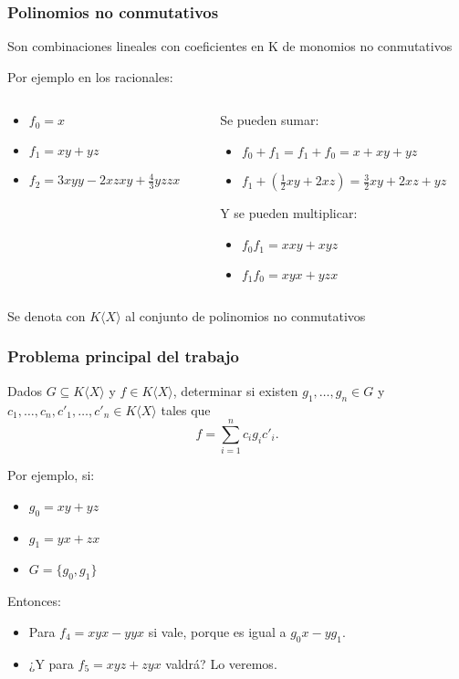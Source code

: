 \documentclass[spanish, aspectratio=169, hidecontrols]{beamer}
\begin{document}
\begin{frame}
  \frametitle{Polinomios no conmutativos}
  Son combinaciones lineales con coeficientes en K de monomios no conmutativos
  \pause
  \begin{exampleblock}{Por ejemplo en los racionales:}
    \begin{columns}
      \begin{column}{0.5\textwidth}
        \begin{itemize}
          \item $f_0 = x$
          \item $f_1 = xy + yz$
          \item $f_2 = 3 xyy - 2 xzxy + \frac{4}{3} yzzx$
        \end{itemize}
      \end{column}
      \begin{column}{0.5\textwidth}
        \pause
        Se pueden sumar:
        \begin{itemize}
          \item $f_0 + f_1 = f_1 + f_0 = x + xy + yz$
          \item $f_1 + (\frac{1}{2}xy + 2 xz) = \frac{3}{2} xy + 2 xz + yz$
        \end{itemize}
        \pause
        Y se pueden multiplicar:
        \begin{itemize}
          \item $f_0 f_1 = xxy + xyz$
          \item $f_1 f_0 = xyx + yzx$
        \end{itemize}
      \end{column}
    \end{columns}
  \end{exampleblock}

  \pause

  Se denota con $K⟨X⟩$ al conjunto de polinomios no conmutativos
\end{frame}

\begin{frame}
  \frametitle{Problema principal del trabajo}
  Dados $G ⊆ K⟨X⟩$ y $f ∈ K⟨X⟩$, determinar si existen $g_1, …, g_n ∈ G$ y $c_1, …, c_n, c'_1, …, c'_n ∈ K⟨X⟩$ tales que
  \[ f = ∑_{i = 1}^n c_i g_i c'_i \text{.}\]
  \pause
  \begin{exampleblock}{Por ejemplo, si:}
    \begin{itemize}
      \item $g_0 = xy + yz$
      \item $g_1 = yx + zx$
      \item $G = \{g_0, g_1\}$
    \end{itemize}
    Entonces:
    \begin{itemize}
      \item Para $f_4 = xyx - yyx$ si vale\pause, porque es igual a $g_0 x - y g_1$. %
      \pause
      \item ¿Y para $f_5 = xyz + zyx$ valdrá? \pause Lo veremos.
    \end{itemize}
  \end{exampleblock}

\end{frame}
\end{document}

